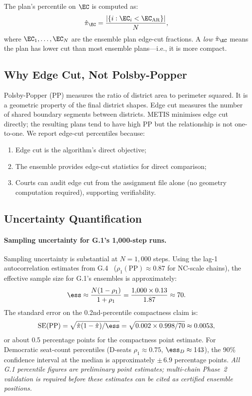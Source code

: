 The \ar{} plan's percentile on $\EC$ is computed as:
\begin{equation}
  \hat\pi_{\EC} = \frac{|\{i : \EC_i < \EC_{\mathrm{AR}}\}|}{N},
\end{equation}
where $\EC_1, \ldots, \EC_N$ are the ensemble plan edge-cut fractions.
A \emph{low} $\hat\pi_{\EC}$ means the \ar{} plan has lower cut than most
ensemble plans---i.e., it is more compact.

\subsection{Why Edge Cut, Not Polsby-Popper}

Polsby-Popper (PP) measures the ratio of district area to perimeter squared.
It is a geometric property of the final district shapes.  Edge cut measures
the number of shared boundary segments between districts.  METIS minimises
edge cut directly; the resulting plans tend to have high PP but the
relationship is not one-to-one.  We report edge-cut percentiles because:
\begin{enumerate}
  \item Edge cut is the \ar{} algorithm's direct objective;
  \item The \recom{} ensemble provides edge-cut statistics for direct comparison;
  \item Courts can audit edge cut from the assignment file alone (no geometry
    computation required), supporting verifiability.
\end{enumerate}

\subsection{Uncertainty Quantification}

\paragraph{Sampling uncertainty for G.1's 1{,}000-step runs.}
Sampling uncertainty is substantial at $N = 1{,}000$ steps.
Using the lag-1 autocorrelation estimates from G.4~\citep{dellaLibera2026g4}
($\rho_1(\mathrm{PP}) \approx 0.87$ for NC-scale chains), the effective sample
size for G.1's ensembles is approximately:
\[
  \ess \approx \frac{N(1-\rho_1)}{1+\rho_1}
  = \frac{1{,}000 \times 0.13}{1.87} \approx 70.
\]
The standard error on the 0.2nd-percentile compactness claim is:
\begin{equation}
  \mathrm{SE}(\mathrm{PP}) = \sqrt{\hat\pi(1-\hat\pi)/\ess}
  = \sqrt{0.002 \times 0.998 / 70} \approx 0.0053,
\end{equation}
or about 0.5 percentage points for the compactness point estimate.
For Democratic seat-count percentiles (D-seats $\rho_1 \approx 0.75$,
$\ess_D \approx 143$), the 90\% confidence interval at the median is
approximately $\pm\,6.9$ percentage points.
\emph{All G.1 percentile figures are preliminary point estimates;
multi-chain Phase~2 validation is required before these estimates
can be cited as certified ensemble positions.}

